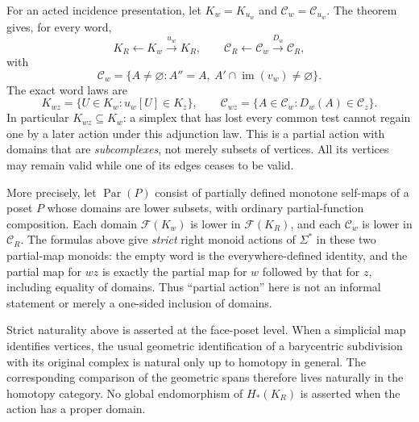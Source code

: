 \documentclass[11pt]{article}
\theoremstyle{remark}
\begin{document}
For an acted incidence presentation, let $K_w=K_{u_w}$ and
$\mathcal C_w=\mathcal C_{u_w}$. The theorem gives, for every word,
\[
 K_R\longleftarrow K_w\xrightarrow{u_w}K_R,
 \qquad
 \mathcal C_R\longleftarrow\mathcal C_w\xrightarrow{D_w}\mathcal C_R,
\]
with
\[
 \mathcal C_w=\{A\ne\varnothing:A''=A,
                  \ A'\cap\operatorname{im}(v_w)\ne\varnothing\}.
\]
The exact word laws are
\[
 K_{wz}=\{U\in K_w:u_w[U]\in K_z\},\qquad
 \mathcal C_{wz}=\{A\in\mathcal C_w:D_w(A)\in\mathcal C_z\}.
\]
In particular $K_{wz}\subseteq K_w$: a simplex that has lost every
common test cannot regain one by a later action under this adjunction law.
This is a partial action with domains that are \emph{subcomplexes}, not
merely subsets of vertices. All its vertices may remain valid while one
of its edges ceases to be valid.

More precisely, let $\operatorname{Par}(P)$ consist of partially defined
monotone self-maps of a poset $P$ whose domains are lower subsets, with
ordinary partial-function composition. Each domain
$\mathcal F(K_w)$ is lower in $\mathcal F(K_R)$, and each
$\mathcal C_w$ is lower in $\mathcal C_R$. The formulas above give
\emph{strict} right monoid actions of $\Sigma^*$ in these two partial-map
monoids: the empty word is the everywhere-defined identity, and the
partial map for $wz$ is exactly the partial map for $w$ followed by that
for $z$, including equality of domains. Thus ``partial action'' here is
not an informal statement or merely a one-sided inclusion of domains.

Strict naturality above is asserted at the face-poset level. When a
simplicial map identifies vertices, the usual geometric identification
of a barycentric subdivision with its original complex is natural only
up to homotopy in general. The corresponding comparison of the geometric
spans therefore lives naturally in the homotopy category. No global
endomorphism of $H_*(K_R)$ is asserted when the action has a proper domain.
\end{document}
